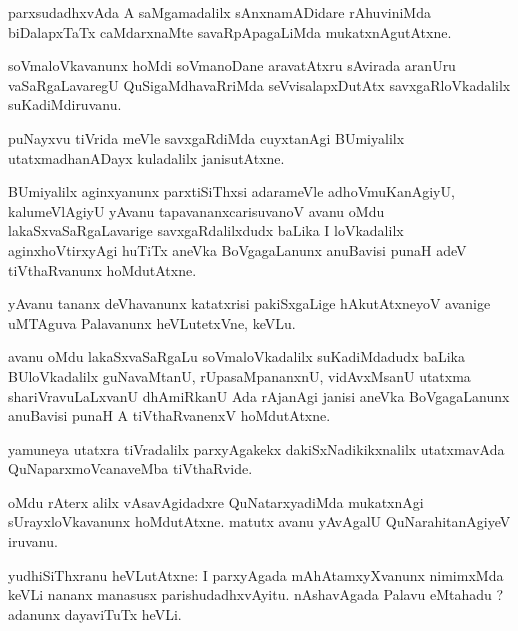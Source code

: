 \documentclass{article}
\begin{document}
\begin{mn}
parxsudadhxvAda A saMgamadalilx sAnxnamADidare rAhuviniMda biDalapxTaTx caMdarxnaMte 
savaRpApagaLiMda mukatxnAgutAtxne.
\end{mn}

\begin{mn}
soVmaloVkavanunx hoMdi soVmanoDane aravatAtxru sAvirada aranUru vaSaRgaLavaregU 
QuSigaMdhavaRriMda seVvisalapxDutAtx savxgaRloVkadalilx suKadiMdiruvanu.
\end{mn}

\begin{mn}
puNayxvu tiVrida meVle savxgaRdiMda cuyxtanAgi BUmiyalilx utatxmadhanADayx kuladalilx janisutAtxne.
\end{mn}

\begin{mn}
BUmiyalilx aginxyanunx parxtiSiThxsi adarameVle  adhoVmuKanAgiyU, kalumeVlAgiyU yAvanu 
tapavananxcarisuvanoV avanu oMdu lakaSxvaSaRgaLavarige savxgaRdalilxdudx baLika I loVkadalilx 
aginxhoVtirxyAgi huTiTx aneVka BoVgagaLanunx anuBavisi punaH adeV tiVthaRvanunx hoMdutAtxne.
\end{mn}

\begin{mn}
yAvanu tananx deVhavanunx katatxrisi pakiSxgaLige hAkutAtxneyoV avanige uMTAguva Palavanunx 
heVLutetxVne, keVLu.
\end{mn}

\begin{mn}
avanu oMdu lakaSxvaSaRgaLu soVmaloVkadalilx suKadiMdadudx baLika BUloVkadalilx guNavaMtanU, 
rUpasaMpananxnU, vidAvxMsanU utatxma shariVravuLaLxvanU dhAmiRkanU Ada rAjanAgi janisi aneVka 
BoVgagaLanunx anuBavisi punaH A tiVthaRvanenxV hoMdutAtxne.
\end{mn}

\begin{mn}
yamuneya utatxra tiVradalilx parxyAgakekx dakiSxNadikikxnalilx utatxmavAda QuNaparxmoVcanaveMba 
tiVthaRvide.
\end{mn}

\begin{mn}
oMdu rAterx alilx vAsavAgidadxre QuNatarxyadiMda mukatxnAgi sUrayxloVkavanunx hoMdutAtxne. matutx 
avanu yAvAgalU QuNarahitanAgiyeV iruvanu.
\end{mn}


\begin{mn}
yudhiSiThxranu heVLutAtxne: I parxyAgada mAhAtamxyXvanunx nimimxMda keVLi nananx manasusx 
parishudadhxvAyitu. nAshavAgada Palavu eMtahadu ? adanunx dayaviTuTx heVLi.
\end{mn}
\end{document}
